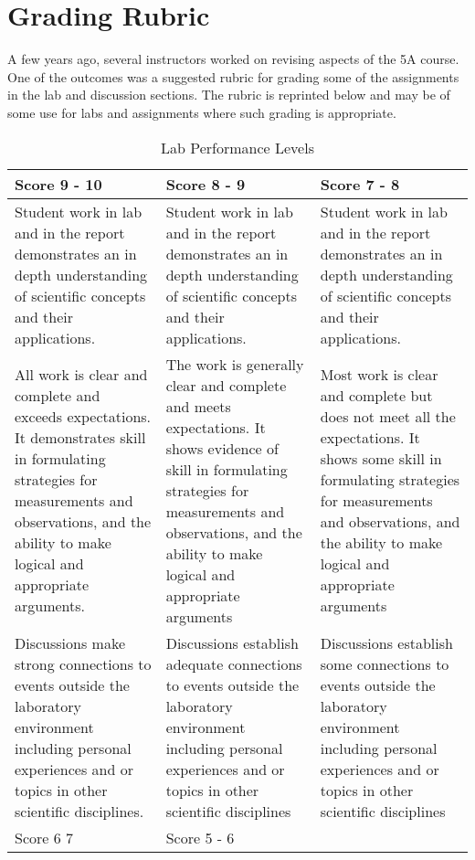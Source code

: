 \section{Grading Rubric}
A few years ago, several instructors worked on revising aspects of the 5A course. One of the outcomes was a suggested rubric for grading some of the assignments in the lab and discussion sections. The rubric is reprinted below and may be of some use for labs and assignments where such grading is appropriate.
\begin{table}[htbp] \caption{Lab Performance Levels} \label{t:performance}
\centering
\begin{tabular}{p{2in}p{2in}p{2in}} \toprule
Score 9 - 10		&Score 8 - 9		&Score 7 - 8\\
\midrule
Student work in lab and in the report demonstrates an in depth understanding of scientific concepts and their applications.
	&Student work in lab and in the report demonstrates an in depth understanding of scientific concepts and their applications.
	&Student work in lab and in the report demonstrates an in depth understanding of scientific concepts and their applications.\\
	\midrule
All work is clear and complete and exceeds expectations. It demonstrates skill in formulating strategies for measurements and observations, and the ability to make logical and appropriate arguments.
	&The work is generally clear and complete and meets expectations. It shows evidence of skill in formulating strategies for measurements and observations, and the ability to make logical and appropriate arguments
	&Most work is clear and complete but does not meet all the expectations. It shows some skill in formulating strategies for measurements and observations, and the ability to make logical and appropriate arguments\\
	\midrule
Discussions make strong connections to events outside the laboratory environment including personal experiences and or topics in other scientific disciplines.
	&Discussions establish adequate connections to events outside the laboratory environment including personal experiences and or topics in other scientific disciplines
	&Discussions establish some connections to events outside the laboratory environment including personal experiences and or topics in other scientific disciplines\\

\bottomrule
	
Score 6  7
&Score 5 - 6\\ \midrule


\end{tabular}
\end{table}
